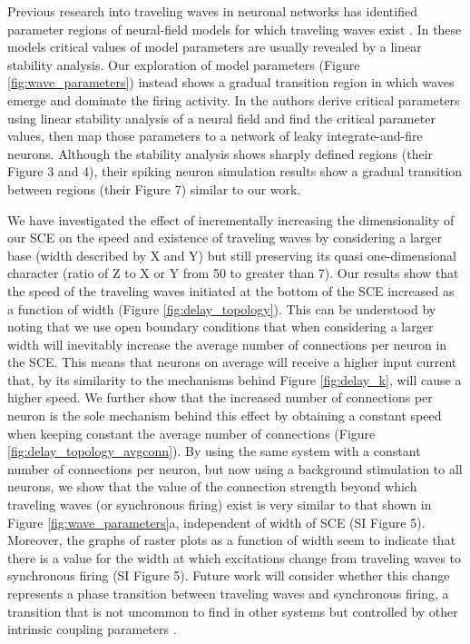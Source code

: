 Previous research into traveling waves in neuronal networks has identified parameter regions of neural-field models for which traveling waves exist \citep{Wilson1973}\citep{Ermentrout1979}. 
In these models critical values of model parameters are usually revealed by a linear stability analysis.
Our exploration of model parameters (Figure \ref{fig:wave_parameters}) instead shows a gradual transition region in which waves emerge and dominate the firing activity.
In \citep{Senk2020} the authors derive critical parameters using linear stability analysis of a neural field and find the critical parameter values, then map those parameters
to a network of leaky integrate-and-fire neurons.
Although the stability analysis shows sharply defined regions (their Figure 3 and 4), their spiking neuron simulation results show a gradual transition between regions (their Figure 7) similar to our work.

We have investigated the effect of incrementally increasing the dimensionality of our SCE on the speed and existence of traveling waves by considering a larger base (width described by X and Y) 
but still preserving its quasi one-dimensional character (ratio of Z to X or Y from 50 to greater than 7).
Our results show that the speed of the traveling waves initiated at the bottom of the SCE increased as a function of width (Figure \ref{fig:delay_topology}).
This can be understood by noting that we use open boundary conditions that when considering a larger width will inevitably increase the average number of connections per neuron in the SCE.
This means that neurons on average will receive a higher input current that, by its similarity to the mechanisms behind Figure \ref{fig:delay_k}, will cause a higher speed. 
We further show that the increased number of connections per neuron is the sole mechanism behind this effect by obtaining a constant speed when keeping constant the average number of connections
(Figure \ref{fig:delay_topology_avgconn}).
By using the same system with a constant number of connections per neuron, but now using a background stimulation to all neurons, we show that the value of the connection strength beyond which traveling waves (or synchronous firing) exist is very similar to that shown in Figure \ref{fig:wave_parameters}a, independent of width of SCE (SI Figure 5).
Moreover, the graphs of raster plots as a function of width seem to indicate that there is a value for the width at which excitations change from traveling waves to synchronous firing (SI Figure 5).
Future work will consider whether this change represents a phase transition between traveling waves and synchronous firing, a transition that is not uncommon to find in other systems but controlled by other intrinsic coupling parameters \citep{ermentrout2001}\citep{Senk2020}.

